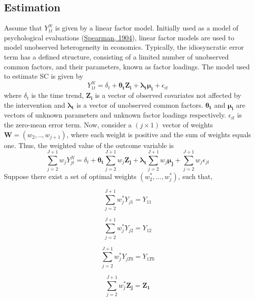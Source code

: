 \documentclass[12pt,nobind, a4paper]{reedthesis}
\begin{document}
 \hypertarget{estimation}{%
 \subsection{Estimation}\label{estimation}}

 Assume that \(Y^{N}_{1t}\) is given by a linear factor model. Initially used as a model of psychological evaluations (\protect\hyperlink{ref-spearman_general_1904}{Spearman, 1904}), linear factor models are used to model unobserved heterogeneity in economics. Typically, the idiosyncratic error term has a defined structure, consisting of a limited number of unobserved common factors, and their parameters, known as factor loadings. The model used to estimate SC is given by
 \begin{equation}
 Y^{N}_{1t}= \delta_{t}+\mathbf{\theta_{t} Z_{i}}+\mathbf{\lambda_{t} \mu_{i}}+ \epsilon_{it}
 \label{eq:eq4}
 \end{equation}
 where \(\delta_{t}\) is the time trend, \(\mathbf{Z_{i}}\) is a vector of observed covariates not affected by the intervention and \(\mathbf{ \lambda_{t}}\) is a vector of unobserved common factors. \(\mathbf{\theta_{t}}\) and \(\mathbf{\mu_{i}}\) are vectors of unknown parameters and unknown factor loadings respectively. \(\epsilon_{it}\) is the zero-mean error term. Now, consider a \((j\times 1)\) vector of weights \(\mathbf{W}=(w_{2},..,w_{j+1})\), where each weight is positive and the sum of weights equals one. Thus, the weighted value of the outcome variable is
 \begin{equation}
 \sum_{j=2}^{J+1}w_{j}Y^{N}_{jt}= \delta_{t}+
 \mathbf{\theta_{t}} \sum_{j=2}^{J+1}w_{j}\mathbf{Z_{j}}+
 \mathbf{\lambda_{t}} \sum_{j=2}^{J+1}w_{j}\mathbf{\mu_{j}}+ \sum_{j=2}^{J+1}w_{j}\epsilon_{jt}
 \label{eq:eq5}
 \end{equation}
 Suppose there exist a set of optimal weights \((w_{2}^{*},...,w_{j}^{*})\), such that,

 \[\sum_{j=2}^{J+1}w_{j}^{*}Y_{j1}=Y_{11}\]

 \[ \sum_{j=2}^{J+1}w_{j}^{*}Y_{j2}=Y_{12}\]

 \[\sum_{j=2}^{J+1}w_{j}^{*}Y_{jT0}=Y_{1T0} \]

 \[\sum_{j=2}^{J+1}w_{j}^{*} \mathbf{Z_{j}}=\mathbf{Z_{1}}\]
\end{document}
